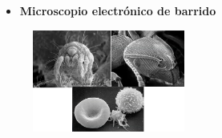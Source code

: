 \documentclass[a4paper]{article}
\begin{document}
    \begin{itemize}
        \item \textbf{Microscopio electrónico de barrido}
    \end{itemize}

    \begin{figure}[h!]
        \centering
        \includegraphics[width = 5cm]{../imagenes/barrido.png}
    \end{figure}
\end{document}
